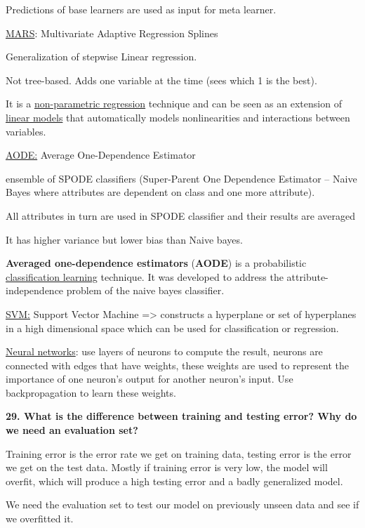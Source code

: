 Predictions of base learners are used as input for meta learner.

\underline{MARS}: Multivariate Adaptive Regression Splines

Generalization of stepwise Linear regression.

Not tree-based. Adds one variable at the time (sees which 1 is the
best).

It is a
\href{https://en.wikipedia.org/wiki/Non-parametric_regression}{non-parametric
regression} technique and can be seen as an extension of
\href{https://en.wikipedia.org/wiki/Linear_model}{linear models} that
automatically models nonlinearities and interactions between variables.

\underline{AODE:} Average One-Dependence Estimator

ensemble of SPODE classifiers (Super-Parent One Dependence Estimator --
Naive Bayes where attributes are dependent on class and one more
attribute).

All attributes in turn are used in SPODE classifier and their results
are averaged

It has higher variance but lower bias than Naive bayes.

\textbf{Averaged one-dependence estimators} (\textbf{AODE}) is a
probabilistic
\href{https://en.wikipedia.org/wiki/Classifier_(mathematics)}{classification
learning} technique. It was developed to address the
attribute-independence problem of the naive bayes classifier.

\underline{SVM:} Support Vector Machine =\textgreater{} constructs a
hyperplane or set of hyperplanes in a high dimensional space which can
be used for classification or regression.

\underline{Neural networks}: use layers of neurons to compute the
result, neurons are connected with edges that have weights, these
weights are used to represent the importance of one neuron's output for
another neuron's input. Use backpropagation to learn these weights.

\textbf{29. What is the difference between training and testing error?
Why do we need an evaluation set?}

Training error is the error rate we get on training data, testing error
is the error we get on the test data. Mostly if training error is very
low, the model will overfit, which will produce a high testing error and
a badly generalized model.

We need the evaluation set to test our model on previously unseen data
and see if we overfitted it.

